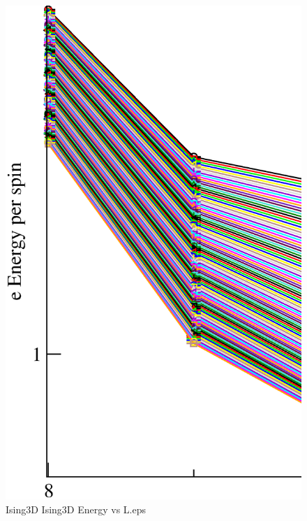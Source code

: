 \begin{figure}[!htpb]
  \centering
  \includegraphics[width=\textwidth]{./plots/Ising3D/Ising3D_Energy_vs_L.eps}
  \caption{Ising3D Ising3D Energy vs L.eps}
\end{figure}

